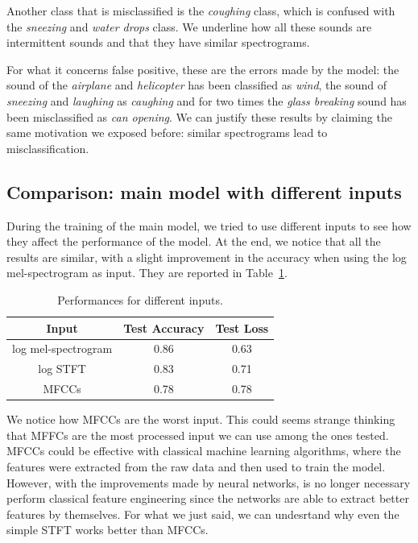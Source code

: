 \documentclass{article}
\begin{document}
\begin{sloppy}
Another class that is misclassified is the \textit{coughing} class, which is confused with the 
\textit{sneezing} and \textit{water drops} class. We underline how all these sounds are intermittent sounds
and that they have similar spectrograms.

For what it concerns false positive, these are the errors made by the model: the sound of the \textit{airplane} and
\textit{helicopter} has been classified as \textit{wind}, the sound of \textit{sneezing} and \textit{laughing} as \textit{caughing}
and for two times the \textit{glass breaking} sound has been misclassified as \textit{can opening}. We can justify
these results by claiming the same motivation we exposed before: similar spectrograms lead to misclassification.


\subsection{Comparison: main model with different inputs}
\label{sec:comparison_1}
During the training of the main model, we tried to use different inputs to see how they affect the performance of the model.
At the end, we notice that all the results are similar, with a slight improvement in the accuracy when using the log mel-spectrogram as input.
They are reported in Table~\ref{tab:comparison_inputs}.
\begin{table}[ht]
  \centering
  \caption{Performances for different inputs.}
  \label{tab:comparison_inputs}
  \begin{tabular}{|c|c|c|}
    \hline
    Input & Test Accuracy & Test Loss \\
    \hline
    log mel-spectrogram & 0.86 & 0.63 \\
    log STFT & 0.83 & 0.71 \\
    MFCCs & 0.78 & 0.78 \\
    \hline
  \end{tabular}
\end{table}

We notice how MFCCs are the worst input. This could seems strange thinking that MFFCs are the most processed input we can use among the ones tested.
MFCCs could be effective with classical machine learning algorithms, where the features were extracted from the raw data and then used to train the model.
However, with the improvements made by neural networks, is no longer necessary perform classical feature engineering since the networks
are able to extract better features by themselves. For what we just said, we can undesrtand why even the simple
STFT works better than MFCCs.



\end{sloppy}
\end{document}
